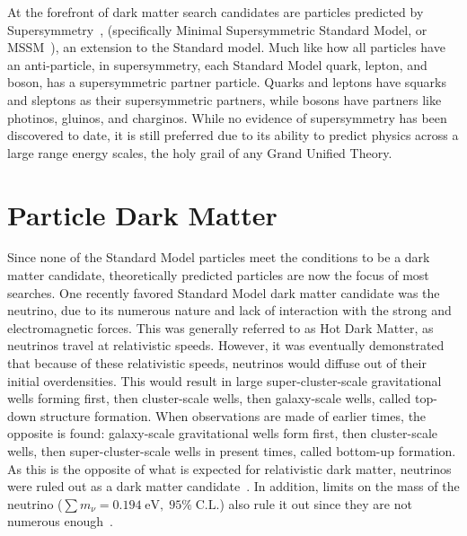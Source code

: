   At the forefront of dark matter search candidates are particles predicted by Supersymmetry~\cite{Jungman:1995df}, (specifically Minimal Supersymmetric Standard Model, or MSSM~\cite{MSSM,supersym1}), an extension to the Standard model.
  Much like how all particles have an anti-particle, in supersymmetry, each Standard Model quark, lepton, and boson, has a supersymmetric partner particle.
  Quarks and leptons have squarks and sleptons as their supersymmetric partners, while bosons have partners like photinos, gluinos, and charginos.
  While no evidence of supersymmetry has been discovered to date, it is still preferred due to its ability to predict physics across a large range energy scales, the holy grail of any Grand Unified Theory.
  

\section{Particle Dark Matter}\label{sec_particledm}

  Since none of the Standard Model particles meet the conditions to be a dark matter candidate, theoretically predicted particles are now the focus of most searches.
  One recently favored Standard Model dark matter candidate was the neutrino, due to its numerous nature and lack of interaction with the strong and electromagnetic forces.
  This was generally referred to as Hot Dark Matter, as neutrinos travel at relativistic speeds.
  However, it was eventually demonstrated that because of these relativistic speeds, neutrinos would diffuse out of their initial overdensities.
  This would result in large super-cluster-scale gravitational wells forming first, then cluster-scale wells, then galaxy-scale wells, called top-down structure formation.
  When observations are made of earlier times, the opposite is found: galaxy-scale gravitational wells form first, then cluster-scale wells, then super-cluster-scale wells in present times, called bottom-up formation.
  As this is the opposite of what is expected for relativistic dark matter, neutrinos were ruled out as a dark matter candidate~\cite{neutrinoHeirarchical}.
  In addition, limits on the mass of the neutrino ($\sum{}m_{\nu} = 0.194 \; \textrm{eV}, \; 95\% \; \textrm{C.L.}$) also rule it out since they are not numerous enough~\cite{planck2015}.
  
